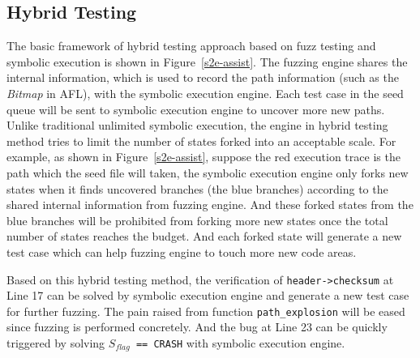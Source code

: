 \subsection{Hybrid Testing}
The basic framework of hybrid testing approach based on fuzz testing and symbolic execution is shown in Figure~\ref{s2e-assist}. The fuzzing engine shares the internal information, which is used to record the path information (such as the \textit{Bitmap} in AFL), with the symbolic execution engine. 
Each test case in the seed queue will be sent to symbolic execution engine to uncover more new paths. 
Unlike traditional unlimited symbolic execution, the engine in hybrid testing method tries to limit the number of states forked into an acceptable scale. For example, as shown in Figure~\ref{s2e-assist}, suppose the red execution trace is the path which the seed file will taken, the symbolic execution engine only forks new states when it finds uncovered branches (the blue branches) according to the shared internal information from fuzzing engine. And these forked states from the blue branches will be prohibited from forking more new states once the total number of states reaches the budget. And each forked state will generate a new test case which can help fuzzing engine to touch more new code areas. 

Based on this hybrid testing method, the verification of \texttt{header->checksum} at Line 17 can be solved by symbolic execution engine and generate a new test case for further fuzzing.
 The pain raised from function \texttt{path\_explosion} will be eased since fuzzing is performed concretely. 
 And the bug at Line 23 can be quickly triggered by solving \texttt{$S_{flag}$ == CRASH} with symbolic execution engine.